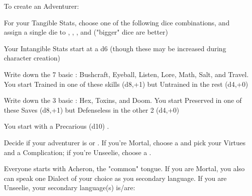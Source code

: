 {  

To create an Adventurer:


For your Tangible Stats, choose one of the following dice combinations, and assign a single die to \VIG, \DEX, \INT, and \FOC ("bigger" dice are better)


Your Intangible Stats start at a d6 (though these may be increased during character creation)



Write down the 7 basic : Bushcraft, Eyeball, Listen, Lore, Math, Salt, and Travel.  You start Trained in one of these skills (d8,+1) but Untrained in the rest (d4,+0)


Write down the 3 basic :  Hex, Toxins, and Doom.  You start Preserved in one of these Saves (d8,+1) but Defenseless in the other 2 (d4,+0)


You start with a Precarious (d10) \DEATH.



Decide if your adventurer is  or .  If you're Mortal, choose a  and pick your Virtues and a Complication; if you're Unseelie, choose a .


Everyone starts with Acheron, the "common" tongue. If you are Mortal, you also can speak one Dialect of your choice as you secondary language.  If you are Unseelie, your secondary language(s) is/are:


}
